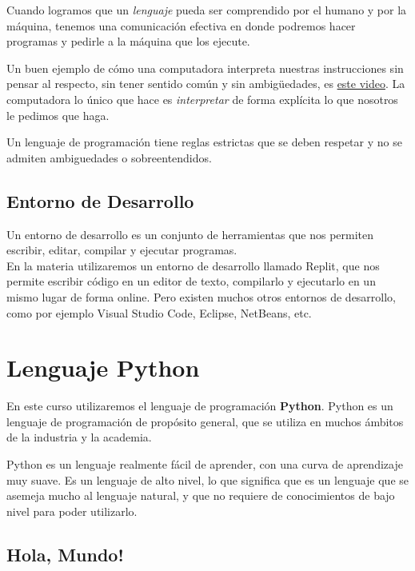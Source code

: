\documentclass[
  letterpaper,
  DIV=11,
  numbers=noendperiod]{scrreprt}
\begin{document}
Cuando logramos que un \emph{lenguaje} pueda ser comprendido por el
humano y por la máquina, tenemos una comunicación efectiva en donde
podremos hacer programas y pedirle a la máquina que los ejecute.

Un buen ejemplo de cómo una computadora interpreta nuestras
instrucciones sin pensar al respecto, sin tener sentido común y sin
ambigüedades, es \href{https://www.youtube.com/watch?v=cDA3_5982h8}{este
video}. La computadora lo único que hace es \emph{interpretar} de forma
explícita lo que nosotros le pedimos que haga.

Un lenguaje de programación tiene reglas estrictas que se deben respetar
y no se admiten ambiguedades o sobreentendidos.

\hypertarget{entorno-de-desarrollo}{%
\subsection{Entorno de Desarrollo}\label{entorno-de-desarrollo}}

Un entorno de desarrollo es un conjunto de herramientas que nos permiten
escribir, editar, compilar y ejecutar programas.\\

En la materia utilizaremos un entorno de desarrollo llamado Replit, que
nos permite escribir código en un editor de texto, compilarlo y
ejecutarlo en un mismo lugar de forma online. Pero existen muchos otros
entornos de desarrollo, como por ejemplo Visual Studio Code, Eclipse,
NetBeans, etc.

\hypertarget{lenguaje-python}{%
\section{Lenguaje Python}\label{lenguaje-python}}

En este curso utilizaremos el lenguaje de programación \textbf{Python}.
Python es un lenguaje de programación de propósito general, que se
utiliza en muchos ámbitos de la industria y la academia.

Python es un lenguaje realmente fácil de aprender, con una curva de
aprendizaje muy suave. Es un lenguaje de alto nivel, lo que significa
que es un lenguaje que se asemeja mucho al lenguaje natural, y que no
requiere de conocimientos de bajo nivel para poder utilizarlo.

\hypertarget{hola-mundo}{%
\subsection{Hola, Mundo!}\label{hola-mundo}}
\end{document}
